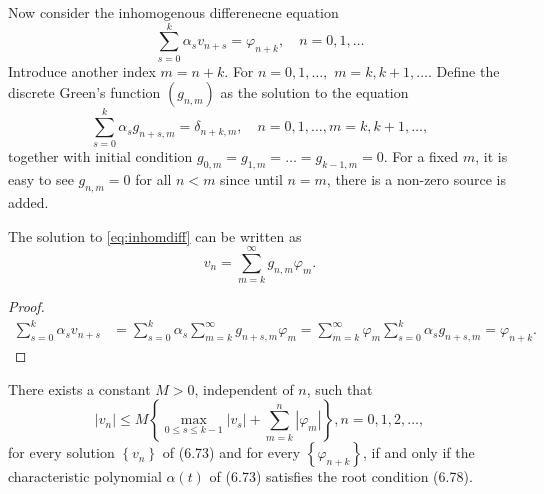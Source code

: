 \documentclass[10pt]{amsart}
\begin{document}
Now consider the inhomogenous differenecne equation
\begin{equation}\label{eq:inhomdiff}
\sum_{s=0}^k \alpha_s v_{n+s} = \varphi_{n+k}, \quad n = 0, 1, \ldots
\end{equation}
Introduce another index $m = n+k$. For $n=0, 1, \ldots,$ $m = k, k+1, \ldots$. Define the discrete Green's function $(g_{n,m})$ as the solution to the equation
\begin{equation}\label{eq:gnm}
\sum_{s=0}^k \alpha_s g_{n+s,m} = \delta_{n+k,m}, \quad n = 0, 1, \ldots, m = k, k+1, \ldots,
\end{equation}
together with initial condition $g_{0,m} = g_{1,m} = \ldots = g_{k-1,m} = 0$. 
For a fixed $m$, it is easy to see $g_{n,m} = 0$ for all $n < m$ since until $n = m$, there is a non-zero source is added. 
\begin{lemma}
The solution to \eqref{eq:inhomdiff} can be written as
 $$
 v_n = \sum_{m=k}^{\infty} g_{n,m}\varphi_m.
 $$
\end{lemma}
\begin{proof}
$$
 \begin{aligned}
\sum_{s=0}^k \alpha_s v_{n+s} & =\sum_{s=0}^k \alpha_s \sum_{m=k}^{\infty} g_{n+s, m} \varphi_m =\sum_{m=k}^{\infty} \varphi_m \sum_{s=0}^k \alpha_s g_{n+s, m}=\varphi_{n+k}.
\end{aligned}
$$
\end{proof}

\begin{theorem}
There exists a constant $M>0$, independent of $n$, such that
$$
\left|v_n\right| \leq M\left\{\max _{0 \leq s \leq k-1}\left|v_s\right|+\sum_{m=k}^n\left|\varphi_m\right|\right\}, n=0,1,2, \ldots,
$$
for every solution $\left\{v_n\right\}$ of (6.73) and for every $\left\{\varphi_{n+k}\right\}$, if and only if the characteristic polynomial $\alpha(t)$ of (6.73) satisfies the root condition (6.78).
\end{theorem}



 
\end{document}
